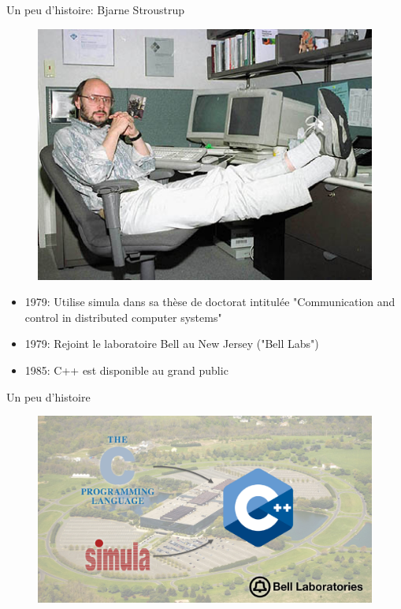 \documentclass[french]{beamer}
\begin{document}
\begin{frame}{Un peu d'histoire: Bjarne Stroustrup}
    \begin{minipage}{0.5\linewidth}
    \begin{figure}
        \includegraphics[width=\linewidth]{BjarneStroustrup.jpg}
    \end{figure}
    \end{minipage}
    \begin{minipage}{0.48\linewidth}
        \begin{itemize}
            \item 1979: Utilise simula dans sa thèse de doctorat intitulée "Communication and control in distributed computer systems"
            \item 1979: Rejoint le laboratoire Bell au New Jersey ("Bell Labs")
            \item 1985: C++ est disponible au grand public
        \end{itemize}
    \end{minipage}
\end{frame}

\begin{frame}{Un peu d'histoire}
    \begin{figure}
        \includegraphics[width=\linewidth]{c_simula.png}
    \end{figure}
\end{frame}
\end{document}
